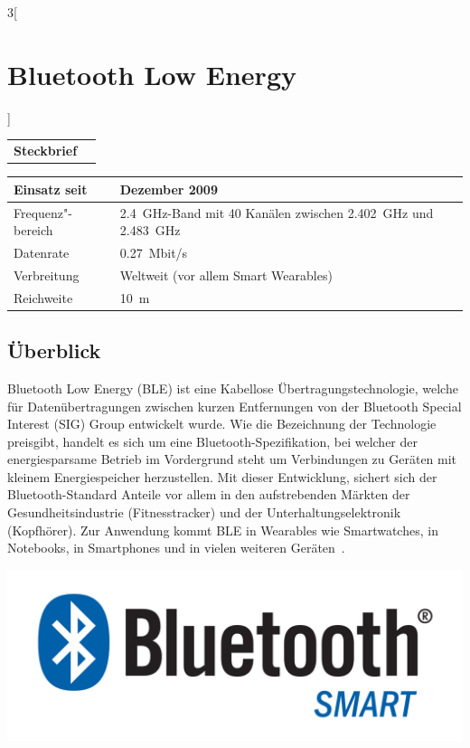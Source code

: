 \begin{multicols}{3}[\section{Bluetooth Low Energy}]


\newrefsegment

\begin{boxedminipage}{\linewidth}
\begin{tabular}{p{}p{2.7 cm}}
\textbf{Steckbrief}& \\
\end{tabular}
\begin{tabular}{p{}|p{2.7 cm}}
      Einsatz seit & Dezember 2009\\
      \hline
      Frequenz"-bereich  & \SI{2,4}{\giga\hertz}-Band mit 40 Kanälen zwischen \SI{2,402}{\giga\hertz} und \SI{2,483}{\giga\hertz}\\
      \hline
      Datenrate & \SI{0,27}{Mbit/s}\\
      \hline
      Verbreitung & Weltweit (vor allem Smart Wearables)\\
      \hline
      Reichweite & \SI{10}{\metre}\\
\end{tabular}
\end{boxedminipage}
\par

\subsection*{Überblick}
Bluetooth Low Energy (BLE) ist eine Kabellose Übertragungstechnologie, welche für Datenübertragungen zwischen kurzen Entfernungen von der Bluetooth Special Interest (SIG) Group entwickelt wurde. Wie die Bezeichnung der Technologie preisgibt, handelt es sich um eine Bluetooth-Spezifikation, bei welcher der energiesparsame Betrieb im Vordergrund steht um Verbindungen zu Geräten mit kleinem Energiespeicher herzustellen. Mit dieser Entwicklung, sichert sich der Bluetooth-Standard Anteile vor allem in den aufstrebenden Märkten der Gesundheitsindustrie (Fitnesstracker) und der Unterhaltungselektronik (Kopfhörer).
Zur Anwendung kommt BLE in Wearables wie Smartwatches, in Notebooks, in Smartphones und in vielen weiteren Geräten~\cite{BLE.4}.

\begin{Figure}
\includegraphics[width=\linewidth]{Kapitel/BLE/Grafiken/Bluetooth_Smart_Logo.png}
\end{Figure}


\end{multicols}
